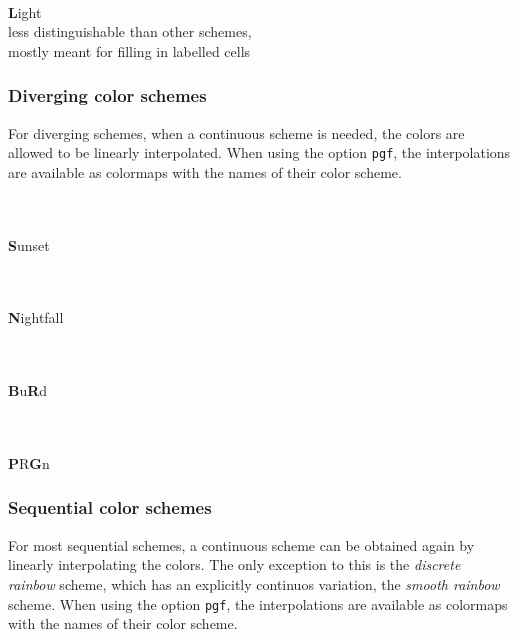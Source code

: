 \documentclass{scrartcl}
\begin{document}
\begin{center}
    \\
    \textbf{L}ight\\
    less distinguishable than other schemes,\\ mostly meant for filling in labelled cells
\end{center}\clearpage

\subsubsection{Diverging color schemes}\label{sec:T-D}
For diverging schemes, when a continuous scheme is needed, the colors are allowed to be linearly interpolated.
When using the option \verb!pgf!, the interpolations are available as colormaps with the names of their color scheme.

\begin{center}
    \\
    \\
    \textbf{S}unset
\end{center}

\begin{center}
    \\
    \\
    \textbf{N}ightfall
\end{center}

\begin{center}
    \\
    \\
    \textbf{B}u\textbf{R}d
\end{center}

\begin{center}
    \\
    \\
    \textbf{P}R\textbf{G}n
\end{center}\clearpage

\subsubsection{Sequential color schemes}\label{sec:T-S}
For most sequential schemes, a continuous scheme can be obtained again by linearly interpolating the colors.
The only exception to this is the \emph{discrete rainbow} scheme, which has an explicitly continuos variation, the \emph{smooth rainbow} scheme.
When using the option \verb!pgf!, the interpolations are available as colormaps with the names of their color scheme.
\end{document}
